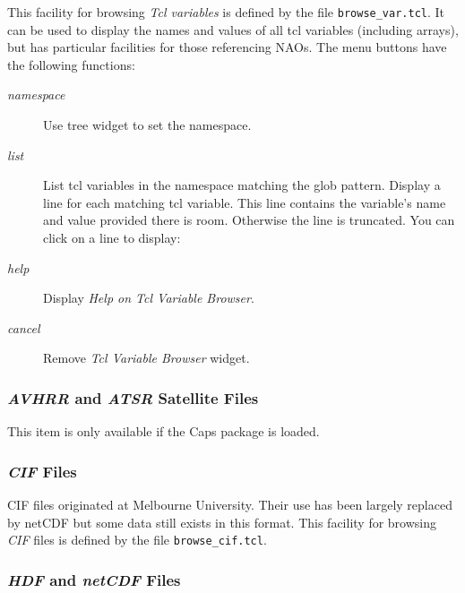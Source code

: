     This facility for browsing 
    \emph{Tcl variables} is defined by the file 
    \texttt{browse\_var.tcl}. It can be used to display the names
    and values of all tcl variables (including arrays), but has
    particular facilities for those referencing NAOs. The menu buttons
    have the following functions:
    \begin{description}
      \item[\emph{namespace}]
      Use tree widget to set the namespace.
      \item[\emph{list}]
      List tcl variables in the namespace matching the glob
      pattern. Display a line for each matching tcl variable. This line
      contains the variable's name and value provided there is
      room. Otherwise the line is truncated. You can click on a line to
      display:
      \item[\emph{help}] Display \emph{Help on Tcl Variable Browser}.
      \item[\emph{cancel}] Remove \emph{Tcl Variable Browser} widget.
    \end{description}

\subsubsection{\emph{AVHRR} and \emph{ATSR} Satellite Files}
\label{caps-nap-menu-AVHRR-ATSR}
	This item is only available if the Caps package is loaded.

\subsubsection{\emph{CIF} Files}
\label{caps-nap-menu-CIF}

    CIF files originated at Melbourne University. Their use has
    been largely replaced by netCDF but some data still exists in this
    format. This facility for browsing 
    \emph{CIF} files is defined by the file 
    \texttt{browse\_cif.tcl}.

\subsubsection{\emph{HDF} and \emph{netCDF} Files}
\label{caps-nap-menu-HDF-netCDF}


